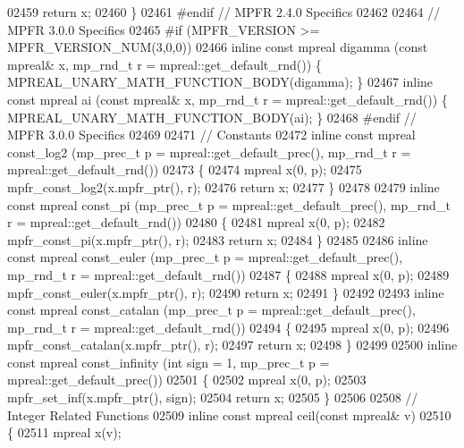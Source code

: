 \begin{DoxyCode}
{{02459     \textcolor{keywordflow}{return} x;
02460 \}
02461 \textcolor{preprocessor}{#endif //  MPFR 2.4.0 Specifics}
02462 
02464 \textcolor{comment}{// MPFR 3.0.0 Specifics}
02465 \textcolor{preprocessor}{#if (MPFR\_VERSION >= MPFR\_VERSION\_NUM(3,0,0))}
02466 \textcolor{keyword}{inline} \textcolor{keyword}{const} mpreal digamma (\textcolor{keyword}{const} mpreal& x, mp\_rnd\_t r = mpreal::get\_default\_rnd()) \{   
      MPREAL\_UNARY\_MATH\_FUNCTION\_BODY(digamma);     \}
02467 \textcolor{keyword}{inline} \textcolor{keyword}{const} mpreal ai      (\textcolor{keyword}{const} mpreal& x, mp\_rnd\_t r = mpreal::get\_default\_rnd()) \{   
      MPREAL\_UNARY\_MATH\_FUNCTION\_BODY(ai);          \}
02468 \textcolor{preprocessor}{#endif // MPFR 3.0.0 Specifics}
02469 
02471 \textcolor{comment}{// Constants}
02472 \textcolor{keyword}{inline} \textcolor{keyword}{const} mpreal const\_log2 (mp\_prec\_t p = mpreal::get\_default\_prec(), mp\_rnd\_t r = 
      mpreal::get\_default\_rnd())
02473 \{
02474     mpreal x(0, p);
02475     mpfr\_const\_log2(x.mpfr\_ptr(), r);
02476     \textcolor{keywordflow}{return} x;
02477 \}
02478 
02479 \textcolor{keyword}{inline} \textcolor{keyword}{const} mpreal const\_pi (mp\_prec\_t p = mpreal::get\_default\_prec(), mp\_rnd\_t r = 
      mpreal::get\_default\_rnd())
02480 \{
02481     mpreal x(0, p);
02482     mpfr\_const\_pi(x.mpfr\_ptr(), r);
02483     \textcolor{keywordflow}{return} x;
02484 \}
02485 
02486 \textcolor{keyword}{inline} \textcolor{keyword}{const} mpreal const\_euler (mp\_prec\_t p = mpreal::get\_default\_prec(), mp\_rnd\_t r = 
      mpreal::get\_default\_rnd())
02487 \{
02488     mpreal x(0, p);
02489     mpfr\_const\_euler(x.mpfr\_ptr(), r);
02490     \textcolor{keywordflow}{return} x;
02491 \}
02492 
02493 \textcolor{keyword}{inline} \textcolor{keyword}{const} mpreal const\_catalan (mp\_prec\_t p = mpreal::get\_default\_prec(), mp\_rnd\_t r = 
      mpreal::get\_default\_rnd())
02494 \{
02495     mpreal x(0, p);
02496     mpfr\_const\_catalan(x.mpfr\_ptr(), r);
02497     \textcolor{keywordflow}{return} x;
02498 \}
02499 
02500 \textcolor{keyword}{inline} \textcolor{keyword}{const} mpreal const\_infinity (\textcolor{keywordtype}{int} sign = 1, mp\_prec\_t p = mpreal::get\_default\_prec())
02501 \{
02502     mpreal x(0, p);
02503     mpfr\_set\_inf(x.mpfr\_ptr(), sign);
02504     \textcolor{keywordflow}{return} x;
02505 \}
02506 
02508 \textcolor{comment}{// Integer Related Functions}
02509 \textcolor{keyword}{inline} \textcolor{keyword}{const} mpreal ceil(\textcolor{keyword}{const} mpreal& v)
02510 \{
02511     mpreal x(v);
}}
\end{DoxyCode}

